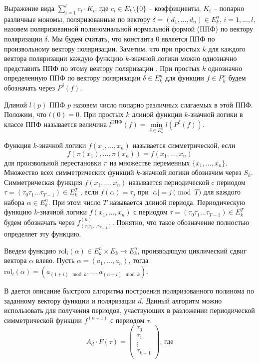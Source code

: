 \documentclass[bibliography=totoc, a4paper, 14pt]{extarticle}
\newcommand{\rol} {\textrm{rol}}
\begin{document}
Выражение вида $\sum\limits_{i=1}^lc_i \cdot K_i$, где $c_i \in E_k\setminus\{0\}$ -- коэффициенты, $K_i$ -- попарно
различные мономы, поляризованные по вектору $\delta = (d_1, \dots, d_n) \in E_k^n$, $i = 1, \dots , l$, назовем
поляризованной полиномиальной нормальной формой (ППФ) по вектору поляризации $\delta$. Мы будем считать, что константа 0
является ППФ по произвольному вектору поляризации. Заметим, что при простых $k$ для каждого вектора поляризации каждую функцию
$k$\nobreakdash-значной логики можно однозначно представить ППФ по этому вектору поляризации \cite{ss02}. При простых $k$
однозначно определенную ППФ по вектору поляризации $\delta \in E_k^n$ для функции
$f \in P_k^n$ будем обозначать через $P^{\delta}(f)$.

Длиной $l(p)$ ППФ $p$ назовем число попарно различных слагаемых в этой
ППФ. Положим, что $l(0) = 0$. При простых $k$ длиной функции $k$\nobreakdash-значной
логики в классе ППФ называется величина $l^{\text{ППФ}}(f) = \min\limits_{\delta \in E_k^n}l(P^{\delta}(f))$.

Функция $k$\nobreakdash-значной логики $f(x_1 ,\dots , x_n)$ называется симметрической, если
$$f(\pi(x_1), \dots, \pi(x_n)) = f(x_1, \dots, x_n)$$
для произвольной перестановки $\pi$ на множестве переменных $\{x_1 , \dots , x_n \}$.
Множество всех симметрических функций $k$\nobreakdash-значной логики обозначим через $S_k$.
Симметрическая функция $f(x_1, \dots, x_n)$ называется периодической c
периодом $\tau = (\tau_0 \tau_1 \dots \tau_{T-1}) \in E_k^T$ , если $f(\alpha) = \tau_j$ при $|\alpha| = j \pmod T$
для каждого набора $\alpha \in E_k^n$. При этом число $T$ называется длиной периода. Периодическую функцию
$k$\nobreakdash-значной логики $f(x_1 , \dots , x_n)$ с периодом $\tau = (\tau_0 \tau_1 \dots \tau_{T-1}) \in E_k^T$
будем обозначать через $f^{(n)}_{(\tau_0 \tau_1 \dots \tau_{T-1})}$. Понятно, что
такое обозначение полностью определяет эту функцию.

Введем функцию $\rol_i(\alpha) \in E_k^n \times E_k \rightarrow E_k^n$, производящую циклический сдвиг вектора $\alpha$
влево. Пусть $\alpha = (a_1, \dots, a_n)$, тогда $\rol_i(\alpha) = (a_{(1+i)\mod k}, \dots, a_{(n+i)\mod k})$.

В \cite{sm09} дается описание быстрого алгоритма построения поляризованного полинома по заданному вектору
функции и поляризации $d$. Данный алгоритм можно использовать для получения периодов, участвующих в разложении
периодической симметрической функции $f^{(n+1)}$ с периодом $\tau$. 
$$A_d \cdot F(\tau) = \begin{pmatrix}
\tau_0 \\
\tau_1 \\
\vdots \\
\tau_{k-1} \\
\end{pmatrix} \text{, где}
$$
\end{document}
